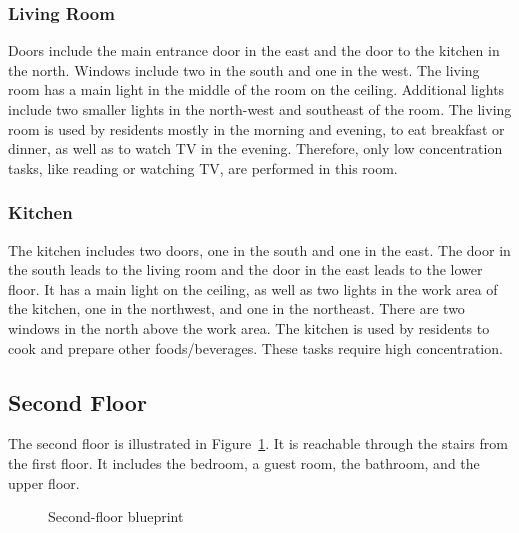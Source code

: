 \documentclass[letterpaper, 11pt]{Proposal}
\def\Fig#1{Figure~\ref{#1}}
\begin{document}
\subsubsection{Living Room}\label{subsec:04_rooms_livRoom}
Doors include the main entrance door in the east 
and the door to the kitchen in the north. 
Windows include two in the south and one in the west.
The living room has a main light in the middle of the room on the ceiling. 
Additional lights include two smaller lights in the north-west 
and southeast of the room.
The living room is used by residents mostly in the morning and evening,
to eat breakfast or dinner, as well as to watch TV in the evening.
Therefore, only low concentration tasks, like reading or watching TV, 
are performed in this room.

\subsubsection{Kitchen}\label{subsec:04_rooms_kitchen}
The kitchen includes two doors, one in the south and one in the east. 
The door in the south leads to the living room and the door in the east
leads to the lower floor.
It has a main light on the ceiling, as well as two lights in the work 
area of the kitchen, one in the northwest, and one in the northeast.
There are two windows in the north above the work area.
The kitchen is used by residents to cook and prepare other foods/beverages. 
These tasks require high concentration.

\subsection{Second Floor}\label{subsec:04_rooms_scndFloor}
The second floor is illustrated in \Fig{fig:04_rooms_scndFloor_blueprint}. 
It is reachable through the stairs from the first floor.
It includes the bedroom, a guest room, the bathroom, and the upper floor.
\begin{figure}
    \centering
    \caption{Second-floor blueprint}
    \label{fig:04_rooms_scndFloor_blueprint}
\end{figure}
\end{document}
